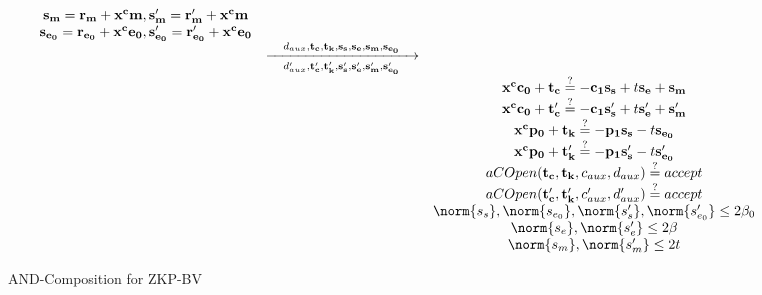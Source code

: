 \begin{description}
\begin{figure}[h!]
\begin{equation*}
\begin{array}{c c c}
        \mathbf{s_m = r_m + x^cm},\mathbf{s'_m = r'_m + x^cm} & & \\
        \mathbf{s_{e_0} = r_{e_0} + x^ce_0},\mathbf{s'_{e_0} = r'_{e_0} + x^ce_0} & & \\
                               & \xrightarrow[\hspace{1em}d'_{aux}, \mathbf{t'_c, t'_k, s'_s, s'_e, s'_m,
                                 s'_{e_0}}\hspace{1em}]{\hspace{1em}d_{aux}, \mathbf{t_c, t_k, s_s, s_e, s_m,
                                 s_{e_0}}\hspace{1em}} & \\
                               & & \mathbf{x^cc_0} + \mathbf{t_c} \stackrel{?}{=} -\mathbf{c_1s_s} + t\mathbf{s_e} + \mathbf{s_m}\\
                               & & \mathbf{x^cc_0} + \mathbf{t'_c} \stackrel{?}{=} -\mathbf{c_1s'_s} + t\mathbf{s'_e} + \mathbf{s'_m}\\
                               & & \mathbf{x^cp_0} + \mathbf{t_k} \stackrel{?}{=} -\mathbf{p_1s_s} - t\mathbf{s_{e_0}}\\
                               & & \mathbf{x^cp_0} + \mathbf{t'_k} \stackrel{?}{=} -\mathbf{p_1s'_s} - t\mathbf{s'_{e_0}}\\
                               & & aCOpen(\mathbf{t_c, t_k}, c_{aux}, d_{aux}) \stackrel{?}{=} accept \\
                               & & aCOpen(\mathbf{t'_c, t'_k}, c'_{aux}, d'_{aux}) \stackrel{?}{=} accept \\
                               & & \norm{s_s}, \norm{s_{e_0}},\norm{s'_s}, \norm{s'_{e_0}} \leq 2\beta_0 \\
                               & & \norm{s_e},\norm{s'_e}  \leq 2\beta \\
                               & & \norm{s_m},\norm{s'_m} \leq 2t
      \end{array}
    \end{equation*}
    \caption{AND-Composition for ZKP-BV }
    \label{fig:belhamoudaProtocolAND}
  \end{figure}


\end{description}
